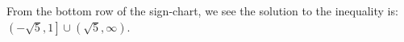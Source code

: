 \documentclass{ximera}
\begin{document}
\begin{problem}
\begin{enumerate}
\begin{explanation}
				From the bottom row of the sign-chart, we see the solution to the inequality is:
				$\left( -\sqrt{5}, 1\right] \cup \left( \sqrt{5}, \infty\right)$.
			\end{explanation}
			
	\end{enumerate}


\end{problem}
\end{document}
